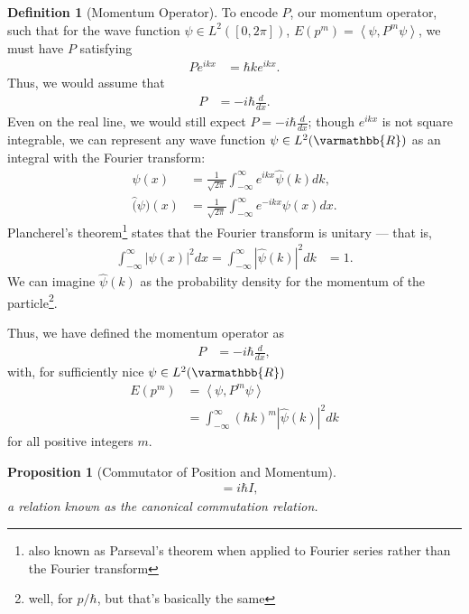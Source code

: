 \documentclass[12pt]{extarticle}
\newcommand{\R}{\varmathbb{R}}
\newcommand{\iprod}[2]{\left\langle #1,#2\right\rangle}
\theoremstyle{plain}
\newtheorem*{proposition}{Proposition}%
\theoremstyle{definition}
\newtheorem*{definition}{Definition}
\theoremstyle{remark}
\renewcommand{\newline}{\hfill\break}
\begin{document}
  \begin{definition}[Momentum Operator]
    To encode $P$, our momentum operator, such that for the wave function $\psi\in L^{2}([0,2\pi])$, $E(p^m) = \iprod{\psi}{P^{m}\psi}$, we must have $P$ satisfying
    \begin{align*}
      Pe^{ikx} &= \hbar k e^{ikx}.
    \end{align*}
    Thus, we would assume that
    \begin{align*}
      P &= -i\hbar \frac{d}{dx}.
    \end{align*}
    Even on the real line, we would still expect $P = -i\hbar \frac{d}{dx}$; though $e^{ikx}$ is not square integrable, we can represent any wave function $\psi \in L^{2}(\R)$ as an integral with the Fourier transform:
    \begin{align*}
      \psi(x) &= \frac{1}{\sqrt{2\pi}}\int_{-\infty}^{\infty}e^{ikx}\hat{\psi}(k)dk,\\
      \hat(\psi)(x) &= \frac{1}{\sqrt{2\pi}}\int_{-\infty}^{\infty}e^{-ikx}\psi(x)dx.
    \end{align*}
    Plancherel's theorem\footnote{also known as Parseval's theorem when applied to Fourier series rather than the Fourier transform} states that the Fourier transform is unitary --- that is,
    \begin{align*}
      \int_{-\infty}^{\infty}|\psi(x)|^2dx = \int_{-\infty}^{\infty}\left\vert \hat{\psi}(k) \right\vert^2dk &= 1.
    \end{align*}
    We can imagine $\hat{\psi}(k)$ as the probability density for the momentum of the particle\footnote{well, for $p/\hbar$, but that's basically the same}.\newline

    Thus, we have defined the momentum operator as
    \begin{align*}
      P &= -i\hbar \frac{d}{dx},
    \end{align*}
    with, for sufficiently nice $\psi\in L^{2}(\R)$
    \begin{align*}
      E(p^{m}) &= \iprod{\psi}{P^{m}\psi}\\
               &= \int_{-\infty}^{\infty}(\hbar k)^m \left\vert \hat{\psi}(k) \right\vert^2 dk
    \end{align*}
    for all positive integers $m$.
  \end{definition}
  \begin{proposition}[Commutator of Position and Momentum]
    \begin{align*}
      [X,P] &= i\hbar I,
    \end{align*}
    a relation known as the canonical commutation relation.
  \end{proposition}
\end{document}
